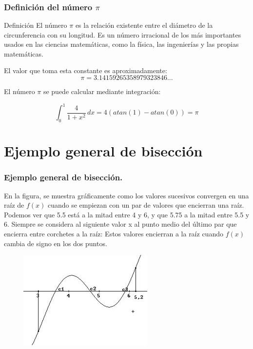 \documentclass{beamer}
\begin{document}
\begin{frame}
\frametitle{Definición del número $\pi$}
\begin{block}{Definición}
El número $\pi$ es la relación existente entre el diámetro de la circunferencia con su longitud.
Es un número irracional de los más importantes usados en las ciencias matemáticas, como la física, las ingenierías y las propias matemáticas.

El valor que toma esta constante es aproximadamente:
 $$\pi = 3.14159265358979323846...$$
\end{block}
El número $\pi$ se puede calcular mediante integración:

$$\int_{0}^{1} \! \frac{4}{1+x^2}\, dx = 4(atan(1) -atan(0)) = \pi $$

\end{frame}

\section{Ejemplo general de bisección}

\begin{frame}
\frametitle{Ejemplo general de bisección.}

\begin{block}{}
En la figura, se muestra gráficamente como los valores sucesivos convergen en una raíz de $f(x)$ cuando se empiezan con un par de valores que encierran una raíz. Podemos ver que 5.5 está a la mitad entre 4 y 6, y que 5.75 a la mitad entre 5.5 y 6. Siempre se considera al siguiente valor x al punto medio del último par que encierra entre corchetes a la raíz: Estos valores encierran a la raíz cuando $f(x)$ cambia de signo en los dos puntos.
\end{block}

\begin{figure}[b]
\begin{center}
\includegraphics[scale=0.4]{images.jpeg}
\end{center}
\end{figure}

\end{frame}
\end{document}
